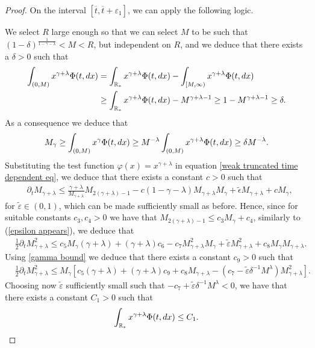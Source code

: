 \documentclass[10pt,a4paper]{amsart}
\newcommand{\der}{\textup{d}}
\begin{document}
\begin{proof}
On the interval $[\overline{t},\overline{t}+\varepsilon_{1}]$, we can apply the following logic.

We select $R$ large enough so that we can select $M$ to be such that $(1-\delta)^{\frac{1}{1-\gamma-\lambda}} < M < R$, but independent on $R$, and we deduce that there exists a $\delta >0$ such that
\begin{align*}
\int_{(0, M ) } x^{\gamma + \lambda}  \Phi(t,\der x)
&= \int_{\mathbb R_* } x^{\gamma + \lambda}\Phi(t, \der x) - \int_{[M, \infty ) } x^{\gamma + \lambda} \Phi(t, \der x) \\
&\geq \int_{\mathbb R_* } x^{\gamma + \lambda}\Phi(t, \der x)- M^{\gamma + \lambda -1 }\geq 1- M^{\gamma + \lambda -1 } \geq \delta. 
\end{align*}
As a consequence we deduce that 
\begin{equation} \label{gamma bound}
M_\gamma  \geq \int_{(0, M)} x^{\gamma} \Phi(t, \der x )  \geq M^{-\lambda} \int_{(0,M)} x^{\gamma+\lambda} \Phi(t, \der x)  \geq  \delta M^{- \lambda}. 
\end{equation}
Substituting the test function $\varphi(x)=x^{\gamma + \lambda} $ in equation \eqref{weak truncated time dependent eq},
we deduce that there exists a constant $c>0$ such that
\begin{align*}
&\partial_t M_{\gamma + \lambda } \leq \frac{\gamma + \lambda}{M_{\gamma+\lambda} } M_{2(\gamma + \lambda ) -1 } - c (1-\gamma -\lambda ) M_{\gamma +\lambda} M_\gamma+ \tilde{\epsilon}  M_{\gamma +\lambda} + c M_\gamma, 
\end{align*}
for $\tilde{\varepsilon}\in(0,1)$, which can be made sufficiently small as before. Hence, since for suitable constants $c_3, c_4 >0$ we have that $M_{2(\gamma+\lambda )-1} \leq c_3 M_\gamma + c_4$, similarly to (\ref{epsilon appears}), we deduce that
\begin{align*}
&\frac{1}{2}\partial_t M^2_{\gamma + \lambda } 
\leq c_5 M_{\gamma }   (\gamma + \lambda)  +(\gamma + \lambda) c_6 - c_7 M^2_{\gamma + \lambda } M_\gamma+\tilde{\varepsilon} M_{\gamma +\lambda}^{2}+c_{8} M_\gamma M_{\gamma+\lambda}.
\end{align*}
 Using \eqref{gamma bound} we deduce that there exists a constant $c_{9}>0$ such that
\begin{align*}
    &\frac{1}{2}\partial_t M^2_{\gamma + \lambda } 
\leq M_{\gamma }  \left[c_5   (\gamma + \lambda)  +(\gamma + \lambda) c_{9}  +c_{8}M_{\gamma+\lambda}-(c_7-\tilde{\varepsilon}\delta^{-1} M^{\lambda}) M^2_{\gamma + \lambda }  \right] .
\end{align*}
Choosing now $\tilde{\varepsilon}$ sufficiently small such that $-c_7+\tilde{\varepsilon}\delta^{-1} M^{\lambda}<0$, we have that there exists a constant $C_{1}>0$ such that 
\begin{align}\label{constant for gamma lambda}
\int_{\mathbb R_*} x^{\gamma + \lambda } \Phi(t, \der x ) \leq C_{1}. 
\end{align}


\end{proof}
\end{document}
